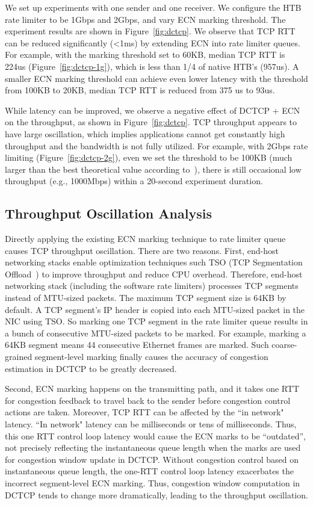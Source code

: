 We set up experiments with one sender and one receiver. We configure the HTB rate limiter to be 1Gbps and 2Gbps, 
and vary ECN marking threshold. The experiment results are shown in Figure~\ref{fig:dctcp}. 
We observe that TCP RTT can be reduced significantly (<1ms) by extending ECN into rate limiter queues. 
For example, with the marking threshold set to 60KB, median TCP RTT is 224us (Figure~\ref{fig:dctcp-1g}), 
which is less than 1/4 of native HTB's (957us). A smaller ECN marking threshold 
can achieve even lower latency \textemdash\xspace with the threshold from 100KB to 20KB, median TCP RTT is reduced from 375 us to 93us.

While latency can be improved, we observe a negative effect of DCTCP + ECN on the throughput, as shown in Figure~\ref{fig:dctcp}.
TCP throughput appears to have large oscillation, 
which implies applications cannot get constantly high throughput and the bandwidth is not fully utilized. 
For example, with 2Gbps rate limiting (Figure~\ref{fig:dctcp-2g}), 
even we set the threshold to be 100KB (much larger than the best theoretical value according to~\cite{alizadeh2010data}), 
there is still occasional low throughput (e.g., 1000Mbps) within a 20-second experiment duration.

\subsection{Throughput Oscillation Analysis}
Directly applying the existing ECN marking technique to rate limiter queue 
causes TCP throughput oscillation. There are two reasons. First, end-host networking stacks 
enable optimization techniques such TSO (TCP Segmentation Offload~\cite{tcp-segment-offload}) to 
improve throughput and reduce CPU overhead. Therefore, end-host networking stack 
(including the software rate limiters) processes TCP segments instead of MTU-sized packets. 
The maximum TCP segment size is 64KB by default. A TCP segment's IP header is copied 
into each MTU-sized packet in the NIC using TSO. So marking one TCP segment in the rate limiter queue 
results in a bunch of consecutive MTU-sized packets to be marked.
For example, marking a 64KB segment means 44 consecutive Ethernet frames are marked. 
Such coarse-grained segment-level marking finally causes the accuracy of congestion estimation in DCTCP to be greatly decreased. 

Second, ECN marking happens on the transmitting path, and it takes one RTT for 
congestion feedback to travel back to the sender before congestion control actions are taken. 
Moreover, TCP RTT can be affected by the ``in network" latency. ``In network" latency can be milliseconds or tens of milliseconds. 
Thus, this one RTT control loop latency 
would cause the ECN marks to be ``outdated'', not precisely reflecting the instantaneous queue length 
when the marks are used for congestion window update in DCTCP.
Without congestion control based on instantaneous queue length, 
the one-RTT control loop latency exacerbates the incorrect segment-level ECN marking. 
Thus, congestion window computation in DCTCP tends to change more dramatically, leading to the throughput oscillation.


